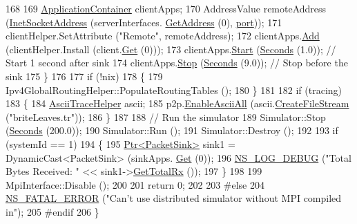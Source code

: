 \begin{DoxyCode}
168 
169       \hyperlink{classns3_1_1ApplicationContainer}{ApplicationContainer} clientApps;
170       AddressValue remoteAddress (\hyperlink{classns3_1_1InetSocketAddress}{InetSocketAddress} (serverInterfaces.
      \hyperlink{classns3_1_1Ipv4InterfaceContainer_ae63208dcd222be986822937ee4aa828c}{GetAddress} (0), \hyperlink{dsdv-manet_8cc_a8e0798404bf2cf5dabb84c5ba9a4f236}{port}));
171       clientHelper.SetAttribute (\textcolor{stringliteral}{"Remote"}, remoteAddress);
172       clientApps.\hyperlink{classns3_1_1ApplicationContainer_ad09ab1a1ad5849d518d5f4c262e38152}{Add} (clientHelper.Install (client.\hyperlink{classns3_1_1NodeContainer_a9ed96e2ecc22e0f5a3d4842eb9bf90bf}{Get} (0)));
173       clientApps.\hyperlink{classns3_1_1ApplicationContainer_a8eff87926507020bbe3e1390358a54a7}{Start} (\hyperlink{group__timecivil_ga33c34b816f8ff6628e33d5c8e9713b9e}{Seconds} (1.0)); \textcolor{comment}{// Start 1 second after sink}
174       clientApps.\hyperlink{classns3_1_1ApplicationContainer_adfc52f9aa4020c8714679b00bbb9ddb3}{Stop} (\hyperlink{group__timecivil_ga33c34b816f8ff6628e33d5c8e9713b9e}{Seconds} (9.0)); \textcolor{comment}{// Stop before the sink}
175     \}
176 
177   \textcolor{keywordflow}{if} (!nix)
178     \{
179       Ipv4GlobalRoutingHelper::PopulateRoutingTables ();
180     \}
181 
182   \textcolor{keywordflow}{if} (tracing)
183     \{
184       \hyperlink{classns3_1_1AsciiTraceHelper}{AsciiTraceHelper} ascii;
185       p2p.\hyperlink{classns3_1_1AsciiTraceHelperForDevice_a63e57c878526c732924e14c1e52cca8b}{EnableAsciiAll} (ascii.\hyperlink{classns3_1_1AsciiTraceHelper_a44960bf2ca32835024eaedd26d1c4f94}{CreateFileStream} (\textcolor{stringliteral}{"briteLeaves.tr"}));
186     \}
187 
188   \textcolor{comment}{// Run the simulator}
189   Simulator::Stop (\hyperlink{group__timecivil_ga33c34b816f8ff6628e33d5c8e9713b9e}{Seconds} (200.0));
190   Simulator::Run ();
191   Simulator::Destroy ();
192 
193   \textcolor{keywordflow}{if} (systemId == 1)
194     \{
195       \hyperlink{classns3_1_1Ptr}{Ptr<PacketSink>} sink1 = DynamicCast<PacketSink> (sinkApps.
      \hyperlink{classns3_1_1ApplicationContainer_a9e565807abd4213a56566a7ccd8d7509}{Get} (0));
196       \hyperlink{group__logging_ga413f1886406d49f59a6a0a89b77b4d0a}{NS\_LOG\_DEBUG} (\textcolor{stringliteral}{"Total Bytes Received: "} << sink1->\hyperlink{classns3_1_1PacketSink_a11e7c4cc4a3c1e16e9abbb2cd3a12334}{GetTotalRx} ());
197     \}
198 
199   MpiInterface::Disable ();
200 
201   \textcolor{keywordflow}{return} 0;
202 
203 \textcolor{preprocessor}{#else}
204   \hyperlink{group__fatal_ga5131d5e3f75d7d4cbfd706ac456fdc85}{NS\_FATAL\_ERROR} (\textcolor{stringliteral}{"Can't use distributed simulator without MPI compiled in"});
205 \textcolor{preprocessor}{#endif}
206 \}
\end{DoxyCode}



